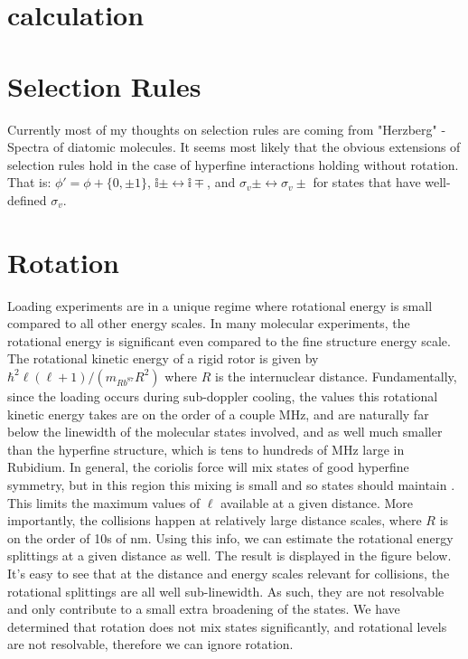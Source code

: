 \documentclass[prl, longbibliography]{revtex4-2}
\begin{document}
\section{calculation}

\section{Selection Rules}
Currently most of my thoughts on selection rules are coming from "Herzberg" - Spectra of diatomic molecules. It seems most likely that the obvious extensions of selection rules hold in the case of hyperfine interactions holding without rotation. That is: $\phi'=\phi+\{0,\pm 1\}$, $\mathbb{i}\pm\leftrightarrow\mathbb{i}\mp$, and $\sigma_v\pm\leftrightarrow\sigma_v\pm$ for states that have well-defined $\sigma_v$. 

\section{Rotation}

Loading experiments are in a unique regime where rotational energy is small compared to all other energy scales. In many molecular experiments, the rotational energy is significant even compared to the fine structure energy scale. The rotational kinetic energy of a rigid rotor is given by $\hbar^2 \ell (\ell+1)/(m_{Rb^{87}}R^2)$ where $R$ is the internuclear distance. Fundamentally, since the loading occurs during sub-doppler cooling, the values this rotational kinetic energy takes are on the order of a couple MHz, and are naturally far below the linewidth of the molecular states involved, and as well much smaller than the hyperfine structure, which is tens to hundreds of MHz large in Rubidium. In general, the coriolis force will mix states of good hyperfine symmetry, but in this region this mixing is small and so states should maintain . This limits the maximum values of $\ell$ available at a given distance. More importantly, the collisions happen at relatively large distance scales, where $R$ is on the order of 10s of nm. Using this info, we can estimate the rotational energy splittings at a given distance as well. The result is displayed in the figure below. It's easy to see that at the distance and energy scales relevant for collisions, the rotational splittings are all well sub-linewidth. As such, they are not resolvable and only contribute to a small extra broadening of the states. We have determined that rotation does not mix states significantly, and rotational levels are not resolvable, therefore we can ignore rotation.
\end{document}

